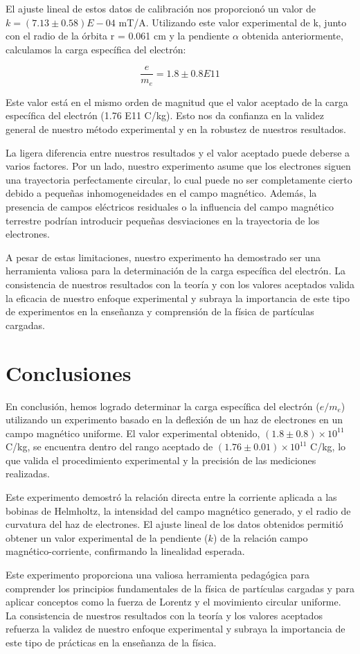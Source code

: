 \documentclass[twocolumn,a4paper,11pt]{scrartcl}
\begin{document}
El ajuste lineal de estos datos de calibración nos proporcionó un valor de $k =  (7.13 \pm 0.58) E-04$ mT/A. Utilizando este valor experimental de k, junto con el radio de la órbita r = 0.061 cm y la pendiente $\alpha$ obtenida anteriormente, calculamos la carga específica del electrón:

\begin{equation}
\frac{e}{m_e} = 1.8 \pm 0.8 E11  
\end{equation}


Este valor está en el mismo orden de magnitud que el valor aceptado de la carga específica del electrón (1.76 E11 C/kg). Esto nos da confianza en la validez general de nuestro método experimental y en la robustez de nuestros resultados.

La ligera diferencia entre nuestros resultados y el valor aceptado puede deberse a varios factores. Por un lado, nuestro experimento asume que los electrones siguen una trayectoria perfectamente circular, lo cual puede no ser completamente cierto debido a pequeñas inhomogeneidades en el campo magnético. Además, la presencia de campos eléctricos residuales o la influencia del campo magnético terrestre podrían introducir pequeñas desviaciones en la trayectoria de los electrones.

A pesar de estas limitaciones, nuestro experimento ha demostrado ser una herramienta valiosa para la determinación de la carga específica del electrón. La consistencia de nuestros resultados con la teoría y con los valores aceptados valida la eficacia de nuestro enfoque experimental y subraya la importancia de este tipo de experimentos en la enseñanza y comprensión de la física de partículas cargadas.

\section{Conclusiones}
En conclusión, hemos logrado determinar la carga específica del electrón ($e/m_e$) utilizando un experimento basado en la deflexión de un haz de electrones en un campo magnético uniforme. El valor experimental obtenido, $(1.8 \pm 0.8) \times 10^{11}$ C/kg, se encuentra dentro del rango aceptado de $(1.76 \pm 0.01) \times 10^{11}$ C/kg, lo que valida el procedimiento experimental y la precisión de las mediciones realizadas.

Este experimento demostró la relación directa entre la corriente aplicada a las bobinas de Helmholtz, la intensidad del campo magnético generado, y el radio de curvatura del haz de electrones. El ajuste lineal de los datos obtenidos permitió obtener un valor experimental de la pendiente ($k$) de la relación campo magnético-corriente, confirmando la linealidad esperada.


Este experimento proporciona una valiosa herramienta pedagógica para comprender los principios fundamentales de la física de partículas cargadas y para aplicar conceptos como la fuerza de Lorentz y el movimiento circular uniforme. La consistencia de nuestros resultados con la teoría y los valores aceptados refuerza la validez de nuestro enfoque experimental y subraya la importancia de este tipo de prácticas en la enseñanza de la física.


  
\end{document}

